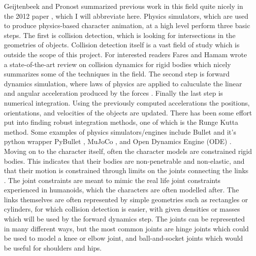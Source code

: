 \documentclass[12pt, a4paper]{article}
\begin{document}
Geijtenbeek and Pronost summarized previous work in this field quite nicely in the 2012 paper \cite{Geijtenbeek}, which I will abbreviate here. Physics simulators, which are used to produce physics-based character animation, at a high level perform three basic steps. The first is collision detection, which is looking for intersections in the geometries of objects. Collision detection itself is a vast field of study which is outside the scope of this project. For interested readers Fares and Hamam \cite{fares2005collision} 
wrote a state-of-the-art review on collision dynamics for rigid bodies which nicely summarizes some of the techniques in the field. The second step is forward dynamics simulation, where laws of physics are applied to caluculate the linear and angular acceleration produced by the forces \cite{walking_survey}. Finally the last step is numerical integration. Using the previously computed accelerations the positions, orientations, and velocities of the objects are updated. There has been some effort put into finding robust integration methods, one of which is the Runge Kutta method. Some examples of physics simulators/engines include Bullet and it's python wrapper PyBullet \cite{pybullet}, MuJoCo \cite{mujoco}, and Open Dynamics Engine (ODE) \cite{ode}.\\ 

Moving on to the character itself, often the character models are constrained rigid bodies. This indicates that their bodies are non-penetrable and non-elastic, and that their motion is constrained through limits on the joints connecting the links \cite{Geijtenbeek}. 
The joint constraints are meant to mimic the real life joint constraints experienced in humanoids, which the characters are often modelled after. The links themselves are often represented by simple geometries such as rectangles or cylinders, for which collision detection is easier, with given densities or masses which will be used by the forward dynamics step. The joints can be represented in many different ways, but the most common joints are hinge joints which could be used to model a knee or elbow joint, and ball-and-socket joints which would be useful for shoulders and hips.\\
\end{document}

